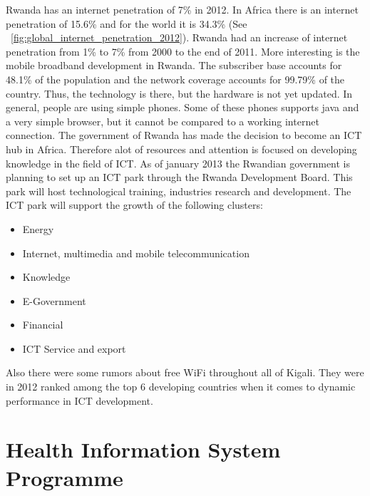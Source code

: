 Rwanda has an internet penetration of 7\% in 2012. 
In Africa there is an internet penetration of 15.6\% and for the world it is 34.3\% (See ~\ref{fig:global_internet_penetration_2012})\cite{4}. 
Rwanda had an increase of internet penetration from 1\% to 7\% from 2000 to the end of 2011\cite{2}.
More interesting is the mobile broadband development in Rwanda. 
The subscriber base accounts for 48.1\% of the population and the network coverage accounts for 99.79\% of the country.
Thus, the technology is there, but the hardware is not yet updated.
In general, people are using simple phones.
Some of these phones supports java and a very simple browser, but it cannot be compared to a working internet connection.
The government of Rwanda has made the decision to become an ICT hub in Africa.
Therefore alot of resources and attention is focused on developing knowledge in the field of ICT. 
As of january 2013 the Rwandian government is planning to set up an ICT park through the Rwanda Development Board.
This park will host technological training, industries research and development. The ICT park will support the growth of the following clusters:
\begin{itemize}
\item Energy
\item Internet, multimedia and mobile telecommunication
\item Knowledge
\item E-Government
\item Financial
\item ICT Service and export
\end{itemize}
\cite{2}
Also there were some rumors about free WiFi throughout all of Kigali.
They were in 2012 ranked among the top 6 developing countries when it comes to dynamic performance in ICT development\cite{5}.

\section{Health Information System Programme}

